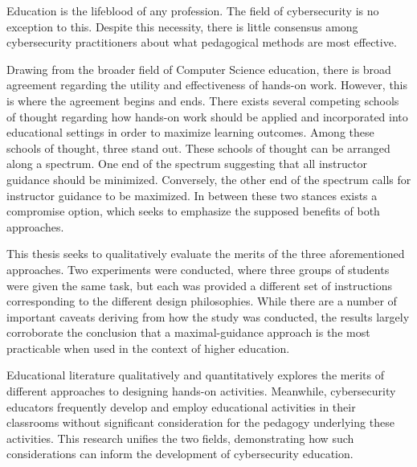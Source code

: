 
\providecommand{\heading}[1]{\section{#1}}
\providecommand{\subheading}[1]{\subsection{#1}}

Education is the lifeblood of any profession. 
The field of cybersecurity is no exception to this. %
Despite this necessity, there is little consensus among cybersecurity practitioners about what pedagogical methods are most effective.

Drawing from the broader field of Computer Science education, there is broad agreement regarding the utility and effectiveness of hands-on work. %
However, this is where the agreement begins and ends. %
There exists several competing schools of thought regarding how hands-on work should be applied and incorporated into educational settings in order to maximize learning outcomes. %
Among these schools of thought, three stand out. %
These schools of thought can be arranged along a spectrum. %
One end of the spectrum suggesting that all instructor guidance should be minimized. %
Conversely, the other end of the spectrum calls for instructor guidance to be maximized. %
In between these two stances exists a compromise option, which seeks to emphasize the supposed benefits of both approaches.

This thesis seeks to qualitatively evaluate the merits of the three aforementioned approaches. %
Two experiments were conducted, where three groups of students were given the same task, but each was provided a different set of instructions corresponding to the different design philosophies. %
While there are a number of important caveats deriving from how the study was conducted, the results largely corroborate the conclusion that a maximal-guidance approach is the most practicable when used in the context of higher education. 

Educational literature qualitatively and quantitatively explores the merits of different approaches to designing hands-on activities. %
Meanwhile, cybersecurity educators frequently develop and employ educational activities in their classrooms without significant consideration for the pedagogy underlying these activities. %
This research unifies the two fields, demonstrating how such considerations can inform the development of cybersecurity education. 
